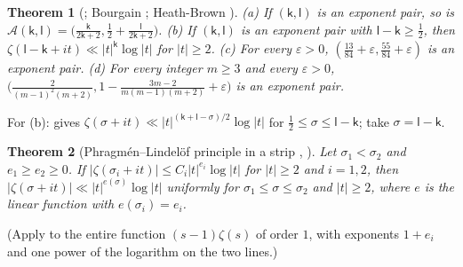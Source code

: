\documentclass[preprint,12pt]{elsarticle}
\numberwithin{equation}{section}
\theoremstyle{plain}
\newtheorem{theorem}{Theorem}[section]
\theoremstyle{definition}
\theoremstyle{remark}
\begin{document}
\begin{theorem}[{\cite[Lemma~2.8 and (7.57)]{Ivic1985}}; Bourgain {\cite[\S5, Thm.~6]{Bourgain2017}}; Heath-Brown {\cite[Thm.~2]{HeathBrown2017}}]\label{thm:known_exponents}
(a) If $(\mathsf k,\mathsf l)$ is an exponent pair, so is $\mathscr A(\mathsf k,\mathsf l)=\bigl(\frac{\mathsf k}{2\mathsf k+2},\frac12+\frac{\mathsf l}{2\mathsf k+2}\bigr)$. (b) If $(\mathsf k,\mathsf l)$ is an exponent pair with $\mathsf l-\mathsf k\ge\frac12$, then $\zeta(\mathsf l-\mathsf k+it)\ll|t|^{\mathsf k}\log|t|$ for $|t|\ge2$. (c) For every $\varepsilon>0$, $(\frac{13}{84}+\varepsilon,\frac{55}{84}+\varepsilon)$ is an exponent pair. (d) For every integer $m\ge3$ and every $\varepsilon>0$, $\bigl(\frac2{(m-1)^2(m+2)},1-\frac{3m-2}{m(m-1)(m+2)}+\varepsilon\bigr)$ is an exponent pair.
\end{theorem}
For (b): \cite[(7.57)]{Ivic1985} gives $\zeta(\sigma+it)\ll|t|^{(\mathsf k+\mathsf l-\sigma)/2}\log|t|$ for $\frac12\le\sigma\le\mathsf l-\mathsf k$; take $\sigma=\mathsf l-\mathsf k$.

\begin{theorem}[Phragm\'en--Lindel\"of principle in a strip {\cite[Lemma~2.5]{BellottiWong2025}}, {\cite[Lemma~3]{Trudgian2014}}]\label{thm:known_PL}
Let $\sigma_1<\sigma_2$ and $e_1\ge e_2\ge0$. If $|\zeta(\sigma_i+it)|\le C_i|t|^{e_i}\log|t|$ for $|t|\ge2$ and $i=1,2$, then $|\zeta(\sigma+it)|\ll|t|^{e(\sigma)}\log|t|$ uniformly for $\sigma_1\le\sigma\le\sigma_2$ and $|t|\ge2$, where $e$ is the linear function with $e(\sigma_i)=e_i$.
\end{theorem}
(Apply \cite[Lemma~2.5]{BellottiWong2025} to the entire function $(s-1)\zeta(s)$ of order $1$, with exponents $1+e_i$ and one power of the logarithm on the two lines.)
\end{document}
